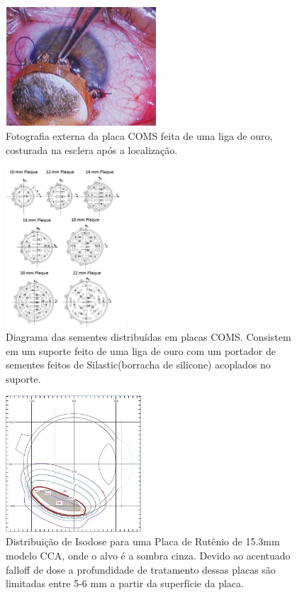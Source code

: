\documentclass[11pt,a4paper]{article}
\begin{document}
    \begin{figure}[h]
        \centering
        \includegraphics[width=0.5\textwidth]{Imagens/placaComsOuroMC.JPG}
        \caption{Fotografia externa da placa COMS feita de uma liga de ouro, costurada na esclera após a localização.}
    \end{figure}
 


    \begin{figure}[h]
        \centering
        \includegraphics[width=0.4\textwidth]{Imagens/placasComs.JPG}
        \caption{Diagrama das sementes distribuídas em placas COMS. Consistem em um suporte feito de uma liga de ouro com um portador de sementes feitos de Silastic(borracha de silicone) acoplados no suporte.}
    \end{figure}


    \begin{figure}[h]
        \centering
        \includegraphics[width=0.45\textwidth]{Imagens/distribDosePlacaOftamRutenio.JPG}
        \caption{Distribuição de Isodose para uma Placa de Rutênio de 15.3mm modelo CCA, onde o alvo é a sombra cinza. Devido ao acentuado falloff de dose a profundidade de tratamento dessas placas são limitadas entre 5-6 mm a partir da superfície da placa.}
    \end{figure}
 
\end{document}
